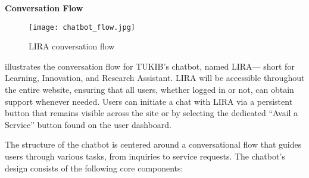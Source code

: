 \newpage

\noindent \textbf{Conversation Flow}

\begin{figure}[h]
	\centering 
	\texttt{[image: chatbot\_flow.jpg]}
	\caption{LIRA conversation flow}
	\label{fig:chatbot_flow}
\end{figure}

 illustrates the conversation flow for TUKIB's chatbot, named LIRA— short for Learning, Innovation, and Research Assistant. LIRA will be accessible throughout the entire website, ensuring that all users, whether logged in or not, can obtain support whenever needed. Users can initiate a chat with LIRA via a persistent button that remains visible across the site or by selecting the dedicated “Avail a Service” button found on the user dashboard.

The structure of the chatbot is centered around a conversational flow that guides users through various tasks, from inquiries to service requests. The chatbot’s design consists of the following core components:

